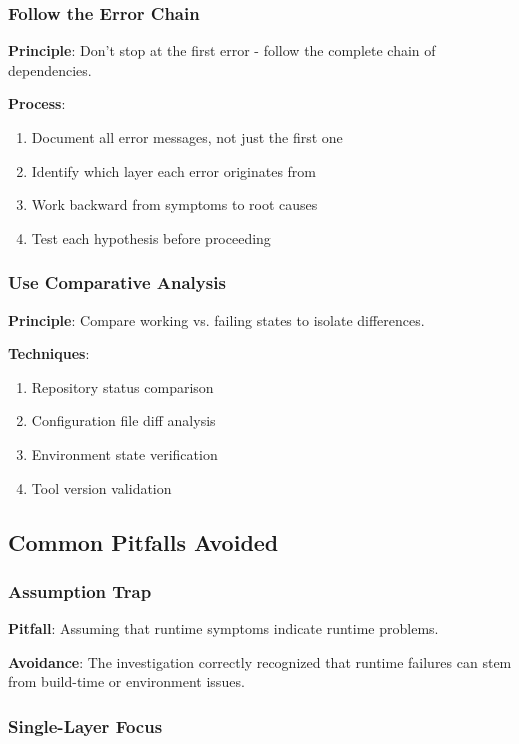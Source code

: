 \documentclass[11pt,a4paper]{article}
\begin{document}
\subsubsection{Follow the Error Chain}

\textbf{Principle}: Don't stop at the first error - follow the complete chain of dependencies.

\textbf{Process}:
\begin{enumerate}
\item Document all error messages, not just the first one
\item Identify which layer each error originates from
\item Work backward from symptoms to root causes
\item Test each hypothesis before proceeding
\end{enumerate}

\subsubsection{Use Comparative Analysis}

\textbf{Principle}: Compare working vs. failing states to isolate differences.

\textbf{Techniques}:
\begin{enumerate}
\item Repository status comparison
\item Configuration file diff analysis
\item Environment state verification
\item Tool version validation
\end{enumerate}

\subsection{Common Pitfalls Avoided}

\subsubsection{Assumption Trap}

\textbf{Pitfall}: Assuming that runtime symptoms indicate runtime problems.

\textbf{Avoidance}: The investigation correctly recognized that runtime failures can stem from build-time or environment issues.

\subsubsection{Single-Layer Focus}
\end{document}
